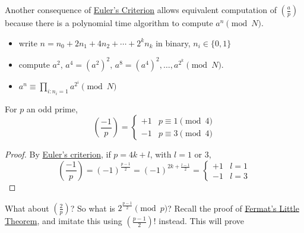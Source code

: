 \documentclass{article}
\newcommand{\legendre}[2]{\genfrac{(}{)}{}{}{#1}{#2}}
\begin{document}
Another consequence of \hyperlink{lem:eulerCriterion}{Euler's Criterion} allows equivalent computation of $\legendre{a}{p}$ because there is a polynomial time algorithm to compute $a^n \pmod{N}$.
\begin{itemize}
    \item write $n = n_0 + 2 n_1 + 4 n_2 + \dotsb + 2^k n_k$ in binary, $n_i \in \{0, 1\}$
    \item compute $a^2, \, a^4 = (a^2)^2, \, a^8 = (a^4)^2, \dotsc, a^{2^k} \pmod{N}$.
    \item $a^n \equiv \prod_{i: n_i = 1} a^{2^i} \pmod{N}$
\end{itemize}

\begin{ncor}\label{cor:3.3}
    For $p$ an odd prime,
    \begin{equation*}
        \legendre{-1}{p} =
        \begin{cases}
            +1 & p \equiv 1 \pmod{4} \\
            -1 & p \equiv 3 \pmod{4}
        \end{cases}
    \end{equation*}
\end{ncor}

\begin{proof}
    By \hyperlink{lem:eulerCriterion}{Euler's criterion}, if $p = 4k + l$, with $l = 1 $ or $3$,
    \begin{equation*}
        \legendre{-1}{p} = (-1)^{\frac{p-1}{2}} = (-1)^{2k + \frac{l-1}{2}} =
        \begin{cases}
            +1 & l = 1 \\
            -1 & l = 3
        \end{cases}
    \end{equation*}
\end{proof}

What about $\legendre{2}{p}$? So what is $2^{\frac{p-1}{2}} \pmod{p}$?
Recall the proof of \hyperlink{thm:fermatLittle}{Fermat's Little Theorem}, and imitate this using $\left(\frac{p-1}{2}\right)!$ instead.
This will prove

\end{document}
